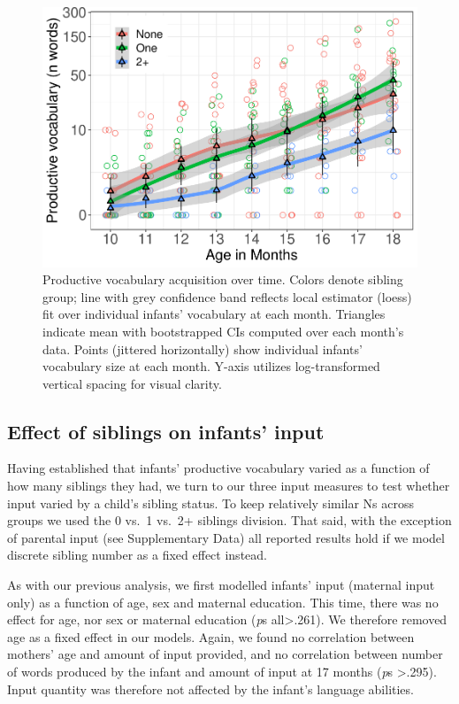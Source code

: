 \documentclass[
  english,
  man,floatsintext]{apa6}
\begin{document}
\begin{figure}
\centering
\includegraphics{SiblingsStudyText_files/figure-latex/Figure-SibGroup-1.pdf}
\caption{\label{fig:Figure-SibGroup}Productive vocabulary acquisition over time. Colors denote sibling group; line with grey confidence band reflects local estimator (loess) fit over individual infants' vocabulary at each month. Triangles indicate mean with bootstrapped CIs computed over each month's data. Points (jittered horizontally) show individual infants' vocabulary size at each month. Y-axis utilizes log-transformed vertical spacing for visual clarity.}
\end{figure}

\hypertarget{effect-of-siblings-on-infants-input}{%
\subsection{Effect of siblings on infants' input}\label{effect-of-siblings-on-infants-input}}

Having established that infants' productive vocabulary varied as a function of how many siblings they had, we turn to our three input measures to test whether input varied by a child's sibling status. To keep relatively similar Ns across groups we used the 0 vs.~1 vs.~2+ siblings division. That said, with the exception of parental input (see Supplementary Data) all reported results hold if we model discrete sibling number as a fixed effect instead.

As with our previous analysis, we first modelled infants' input (maternal input only) as a function of age, sex and maternal education. This time, there was no effect for age, nor sex or maternal education (\emph{p}s all\textgreater.261). We therefore removed age as a fixed effect in our models. Again, we found no correlation between mothers' age and amount of input provided, and no correlation between number of words produced by the infant and amount of input at 17 months (\emph{p}s \textgreater.295). Input quantity was therefore not affected by the infant's language abilities.
\end{document}
